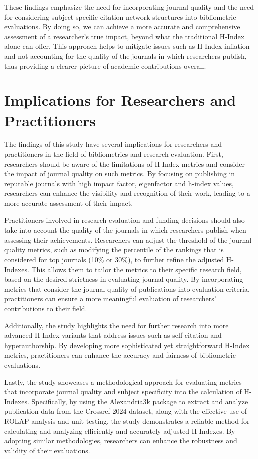 These findings emphasize the need for incorporating journal quality and the
need for considering subject-specific citation network structures into
bibliometric evaluations. By doing so, we can achieve a more accurate and
comprehensive assessment of a researcher's true impact, beyond what the
traditional H-Index alone can offer. This approach helps to mitigate issues
such as H-Index inflation and not accounting for the quality of the journals in
which researchers publish, thus providing a clearer picture of academic
contributions overall.

\section{Implications for Researchers and Practitioners}

The findings of this study have several implications for researchers and
practitioners in the field of bibliometrics and research evaluation. First,
researchers should be aware of the limitations of H-Index metrics and consider
the impact of journal quality on such metrics. By focusing on publishing in
reputable journals with high impact factor, eigenfactor and h-index values,
researchers can enhance the visibility and recognition of their work, leading
to a more accurate assessment of their impact.

Practitioners involved in research evaluation and funding decisions should also
take into account the quality of the journals in which researchers publish when
assessing their achievements. Researchers can adjust the threshold of the
journal quality metrics, such as modifying the percentile of the rankings that
is considered for top journals (10\% or 30\%), to further refine the adjusted
H-Indexes. This allows them to tailor the metrics to their specific research
field, based on the desired strictness in evaluating journal quality. By
incorporating metrics that consider the journal quality of publications into
evaluation criteria, practitioners can ensure a more meaningful evaluation of
researchers' contributions to their field.

Additionally, the study highlights the need for further research into more
advanced H-Index variants that address issues such as self-citation and
hyperauthorship. By developing more sophisticated yet straightforward H-Index
metrics, practitioners can enhance the accuracy and fairness of bibliometric
evaluations.

Lastly, the study showcases a methodological approach for evaluating metrics
that incorporate journal quality and subject specificity into the calculation
of H-Indexes. Specifically, by using the Alexandria3k package to extract and
analyze publication data from the Crossref-2024 dataset, along with the
effective use of ROLAP analysis and unit testing, the study demonstrates a
reliable method for calculating and analyzing efficiently and accurately
adjusted H-Indexes. By adopting similar methodologies, researchers can enhance
the robustness and validity of their evaluations.

